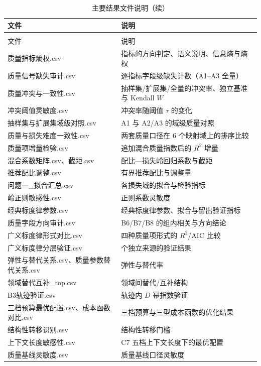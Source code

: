 \begin{longtable}{>{\raggedright\arraybackslash}p{}>{\raggedright\arraybackslash}p{}}
  \caption{主要结果文件说明}
  \label{tab:appendix2} \\
  \toprule
  文件 & 说明 \\
  \midrule
  \endfirsthead
  \caption{主要结果文件说明（续）} \\
  \toprule
  文件 & 说明 \\
  \midrule
  \endhead
  \bottomrule
  \endfoot
  质量指标熵权.csv & 22 指标的方向判定、语义说明、信息熵与熵权 \\
  质量信号缺失审计.csv & 逐指标字段级缺失计数（A1--A3 全量） \\
  质量冲突与一致性.csv & 抽样集/扩展集/全量的冲突率、独立基准与 Kendall $W$ \\
  冲突阈值灵敏度.csv & 冲突率随阈值 $\tau$ 的变化 \\
  抽样集与扩展集域级对照.csv & A1 与 A2/A3 的域级质量对照 \\
  质量与损失难度一致性.csv & 两套质量口径在 6 个映射域上的排序比较 \\
  质量项增量检验.csv & 追加混合质量指数后的 $R^2$ 增量 \\
  混合系数矩阵.csv、截距.csv & 配比—损失岭回归系数与截距 \\
  推荐配比调整.csv & 有界推荐配比与调整量 \\
  问题一\_拟合汇总.csv & 各损失域的拟合与检验指标 \\
  岭正则敏感性.csv & 正则系数灵敏度 \\
  经典标度律参数.csv & 经典标度律参数、拟合与留出验证指标 \\
  质量字段方向审计.csv & B6/B7/B8 的组内相关与方向结论 \\
  广义标度律形式对比.csv & 四种质量项形式的 $R^2$/AIC 比较 \\
  广义标度律分层验证.csv & 6 个独立来源的验证结果 \\
  弹性与替代关系.csv、质量参数替代关系.csv & 弹性与替代率 \\
  领域替代互补\_top.csv & 领域间替代/互补结构 \\
  B3轨迹验证.csv & 轨迹内 $D$ 幂指数验证 \\
  三档预算最优配置.csv、成本函数对比.csv & 三档预算与三型成本函数的优化结果 \\
  结构性转移识别.csv & 结构性转移门槛 \\
  上下文长度敏感性.csv & C7 五档上下文长度下的最优配置 \\
  质量基线灵敏度.csv & 质量基线口径灵敏度 \\

\end{longtable}
